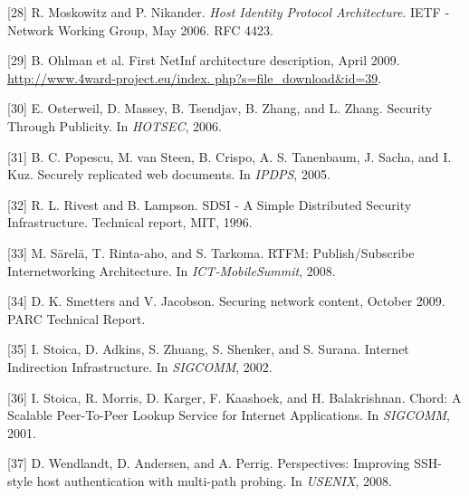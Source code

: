 [28] R. Moskowitz and P. Nikander. \emph{Host Identity Protocol
Architecture}. IETF - Network Working Group, May 2006.
RFC 4423.

[29] B. Ohlman et al. First NetInf architecture description, April
2009. \url{http://www.4ward-project.eu/index.
php?s=file_download&id=39}.

[30] E. Osterweil, D. Massey, B. Tsendjav, B. Zhang, and
L. Zhang. Security Through Publicity. In \emph{HOTSEC}, 2006.

[31] B. C. Popescu, M. van Steen, B. Crispo, A. S. Tanenbaum,
J. Sacha, and I. Kuz. Securely replicated web documents. In
\emph{IPDPS}, 2005.

[32] R. L. Rivest and B. Lampson. SDSI - A Simple Distributed
Security Infrastructure. Technical report, MIT, 1996.

[33] M. Särelä, T. Rinta-aho, and S. Tarkoma. RTFM:
Publish/Subscribe Internetworking Architecture. In
\emph{ICT-MobileSummit}, 2008.

[34] D. K. Smetters and V. Jacobson. Securing network content,
October 2009. PARC Technical Report.

[35] I. Stoica, D. Adkins, S. Zhuang, S. Shenker, and S. Surana.
Internet Indirection Infrastructure. In \emph{SIGCOMM}, 2002.

[36] I. Stoica, R. Morris, D. Karger, F. Kaashoek, and
H. Balakrishnan. Chord: A Scalable Peer-To-Peer Lookup
Service for Internet Applications. In \emph{SIGCOMM}, 2001.

[37] D. Wendlandt, D. Andersen, and A. Perrig. Perspectives: Improving SSH-style host authentication with multi-path
probing. In \emph{USENIX}, 2008.